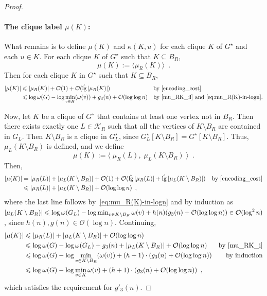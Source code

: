 \documentclass{patmorin}
\let\eqref\cref
\renewcommand{\le}{\leqslant}
\renewcommand{\leq}{\leqslant}
\DeclareMathOperator{\lgg}{\hat{lg}}
\newcommand{\Oh}{\mathcal{O}}
\begin{document}
\begin{proof}
    \paragraph{\boldmath The clique label $\mu(K)$:}
    What remains is to define $\mu(K)$ and $\kappa(K,u)$ for each clique $K$ of $G^\star$ and each $u\in K$.  For each clique $K$ of $G^\star$ such that $K\subseteq B_R$,
    \[
       \mu(K) := \langle \mu_R(K)\rangle \enspace .
    \]
    Then    for each clique $K$ in $G^\star$ such that $K\subseteq B_R$, 
\begin{align*}
    |\mu(K)| &\leq |\mu_R(K)| + \Oh(1) + \Oh(\lgg|\mu_R(K)|)&&\text{by~\eqref{encoding_cost}}\\
    &\leq \log\omega(G) - \log\min_{v\in K}(\omega(v)) + g_3(n) + \Oh(\log\log n)&&\textrm{by~\eqref{mu_RK_ii} and~\eqref{eq:mu_R(K)-in-logn}.}
    \end{align*}
    
    Now, let $K$ be a clique of $G^\star$ that contains at least one vertex not in $B_R$. Then there exists exactly one $L\in\mathcal{K}_R$ such that all the vertices of $K\setminus B_R$ are contained in $G_L$. Then $K\setminus B_R$ is a clique in $G^\star_L$, since $G^\star_L[K\setminus B_R]=G^\star[K\setminus B_R]$. Thus, $\mu_L(K\setminus B_R)$ is defined, and we define
    \[
        \mu(K):= \langle\;\mu_R(L),\;\mu_{L}(K\setminus B_R)\;\rangle
        \enspace .
    \]
    Then,
    \begin{align*}
     |\mu(K)|
       & = |\mu_R(L)| + |\mu_{L}(K\setminus B_R)| + \Oh(1)+\Oh(\lgg|\mu_R(L)|+\lgg|\mu_L(K\setminus B_R)|)
       & \text{by \eqref{encoding_cost}} \\
       & \le |\mu_R(L)| + |\mu_{L}(K\setminus B_R)| + \Oh(\log\log n)\enspace,
       \end{align*}
       where the last line follows by~\eqref{eq:mu_R(K)-in-logn} and by induction as $|\mu_L(K\setminus B_R)|\leq \log\omega(G_L)-\linebreak \log\min_{v\in K\setminus B_R}\omega(v) + h(n)(g_3(n)+\Oh(\log\log n)) \in\Oh(\log^2 n)$, since $h(n),g(n)\in\Oh(\log n)$. Continuing,
       \begin{align*}
       |\mu(K)| & \le |\mu_R(L)| + |\mu_{L}(K\setminus B_R)| + \Oh(\log\log n) \\
       & \le \log\omega(G)-\log \omega(G_{L}) + g_3(n) + |\mu_{L}(K\setminus B_R)| + \Oh(\log\log n)
       & \text{by \eqref{mu_RK_i}}\\
       & \le \log\omega(G) - \log\min_{v\in K\setminus B_R}(\omega(v)) + (h+1)\cdot (g_3(n) +  \Oh(\log\log n))
       & \text{by induction} \\
       & \le \log\omega(G) - \log\min_{v\in K}\omega(v) + (h+1)\cdot (g_3(n) + \Oh(\log\log n)) \enspace ,
    \end{align*}
    which satisfies the requirement for $g'_3(n)$.


\end{proof}
\end{document}
